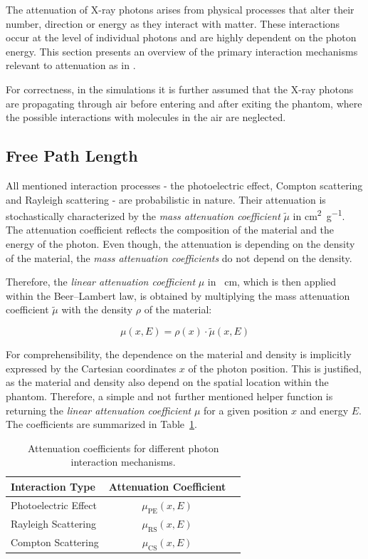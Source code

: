 The attenuation of X-ray photons arises from physical processes that alter their
number, direction or energy as they interact with matter. These interactions
occur at the level of individual photons and are highly dependent on the photon
energy. This section presents an overview of the primary interaction mechanisms
relevant to attenuation as in \cite{medicalImagingSystemsIntro2019:}.

For correctness, in the simulations it is further assumed that the X-ray
photons are propagating through air before entering and after exiting the
phantom, where the possible interactions with molecules in the air are neglected.

\subsection{Free Path Length}

All mentioned interaction processes - the photoelectric effect, Compton
scattering and Rayleigh scattering - are probabilistic in nature. Their
attenuation is stochastically characterized by the \emph{mass attenuation
coefficient} $\tilde{\mu}$ in \si{\square\centi\metre\per\gram}. The attenuation
coefficient reflects the composition of the material and the energy of the
photon.  Even though, the attenuation is depending on the density of the
material, the \emph{mass attenuation coefficients} do not depend on the density.

Therefore, the \emph{linear attenuation coefficient} $\mu$ in
\si{\per\centi\metre}, which is then applied within the Beer--Lambert law, is
obtained by multiplying the mass attenuation coefficient $\tilde{\mu}$ with the
density $\rho$ of the material:

$$\mu(x,E) = \rho(x) \cdot \tilde{\mu}(x,E)$$

For comprehensibility, the dependence on the material and density is implicitly
expressed by the Cartesian coordinates $x$ of the photon position. This is
justified, as the material and density also depend on the spatial location
within the phantom. Therefore, a simple and not further mentioned helper
function is returning the \emph{linear attenuation coefficient} $\mu$ for a
given position $x$ and energy $E$. The coefficients are summarized in
Table~\ref{tab:attenuation_coefficients}.

\begin{table}[H]
    \centering
    \begin{tabular}{lcc}
        \toprule
        \textbf{Interaction Type} & \textbf{Attenuation Coefficient} \\
        \midrule
        Photoelectric Effect & $\mu_{\text{PE}}(x,E)$ \\
        Rayleigh Scattering & $\mu_{\text{RS}}(x,E)$ \\
        Compton Scattering & $\mu_{\text{CS}}(x,E)$ \\
        \bottomrule
    \end{tabular}
    \caption{Attenuation coefficients for different photon interaction mechanisms.}
    \label{tab:attenuation_coefficients}
\end{table}

